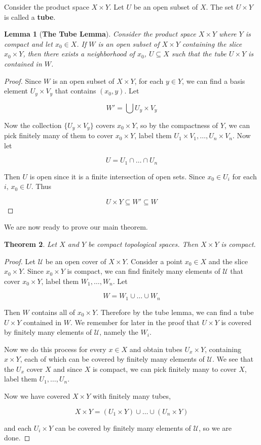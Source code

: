 \documentclass[a4paper]{article}
\newtheorem{theorem}{Theorem}
\newtheorem{lemma}[theorem]{Lemma}
\numberwithin{theorem}{section}
\begin{document}
Consider the product space $X \times Y$. Let $U$ be an open subset of $X$. The set $U \times Y$ is called a \textbf{tube}.

\begin{lemma}[\textbf{The Tube Lemma}] \label{tube}
Consider the product space $X \times Y$ where $Y$ is compact and let $x_0 \in X$. If $W$ is an open subset of $X \times Y$ containing the slice $x_0 \times Y$, then there exists a neighborhood of $x_0$, $U \subseteq X$ such that the tube $U \times Y$ is contained in $W$.
\end{lemma}

\begin{proof}
Since $W$ is an open subset of $X \times Y$, for each $y \in Y$, we can find a basis element $U_y \times V_y$ that contains $(x_0,y)$. Let

$$ W' = \bigcup U_y \times V_y $$

Now the collection $\{U_y \times V_y\}$ covers $x_0 \times Y$, so by the compactness of $Y$, we can pick finitely many of them to cover $x_0 \times Y$, label them $U_1 \times V_1, \dots, U_n \times V_n$. Now let

$$ U = U_1 \cap \dots \cap U_n $$

Then $U$ is open since it is a finite intersection of open sets. Since $x_0 \in U_i$ for each $i$, $x_0 \in U$. Thus 

$$ U \times Y \subseteq W' \subseteq W $$
\end{proof}

We are now ready to prove our main theorem.

\begin{theorem}
Let $X$ and $Y$ be compact topological spaces. Then $X \times Y$ is compact.
\end{theorem}
\begin{proof}
Let $\mathcal{U}$ be an open cover of $X \times Y$. Consider a point $x_0 \in X$ and the slice $x_0 \times Y$. Since $x_0 \times Y$ is compact, we can find finitely many elements of $\mathcal{U}$ that cover $x_0 \times Y$, label them $W_1,\dots,W_n$. Let

$$ W = W_1 \cup \dots \cup W_n $$

Then $W$ contains all of $x_0 \times Y$. Therefore by the tube lemma, we can find a tube $U \times Y$ contained in $W$. We remember for later in the proof that $U \times Y$ is covered by finitely many elements of $\mathcal{U}$, namely the $W_i$.

Now we do this process for every $x \in X$ and obtain tubes $U_x \times Y$, containing $x \times Y$, each of which can be covered by finitely many elements of $\mathcal{U}$. We see that the $U_x$ cover $X$ and since $X$ is compact, we can pick finitely many to cover $X$, label them $U_1,\dots,U_n$. 

Now we have covered $X \times Y$ with finitely many tubes,

$$ X \times Y = (U_1 \times Y) \cup \dots \cup (U_n \times Y) $$

and each $U_i \times Y$ can be covered by finitely many elements of $\mathcal{U}$, so we are done.

\end{proof}
\end{document}
